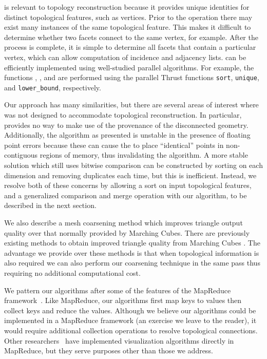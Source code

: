 \documentclass[10pt,journal,cspaper,compsoc]{IEEEtran}
\begin{document}
 is relevant to topology reconstruction because it provides unique identities for distinct topological features, such as vertices. Prior to the operation there may exist many instances of the same topological feature. This makes it difficult to determine whether two facets connect to the same vertex, for example. After the  process is complete, it is simple to determine all facets that contain a particular vertex, which can allow computation of incidence and adjacency lists.   can be efficiently implemented using well-studied parallel algorithms.  For example, the functions ,
, and  are performed using the parallel
Thrust functions \texttt{sort}, \texttt{unique}, and \texttt{lower\_bound},
respectively.

Our approach has many similarities, but there are several areas of interest where  was not designed to accommodate topological reconstruction. In particular,  provides no way to make use of the provenance of the disconnected geometry. Additionally, the  algorithm as presented is unstable in the presence of floating point errors because these can cause the  to place ``identical'' points in non-contiguous regions of memory, thus invalidating the algorithm. A more stable solution which still uses bitwise comparison can be constructed by sorting on each dimension and removing duplicates each time, but this is inefficient. Instead, we resolve both of these concerns by allowing a sort on input topological features, and a generalized comparison and merge operation with our algorithm, to be described in the next section.

We also describe a mesh coarsening method which improves triangle output quality over that normally provided by Marching Cubes. There are previously existing methods to obtain improved triangle quality from Marching Cubes \cite{Moore_Warren_1991}. The advantage we provide over these methods is that when topological information is also required we can also perform our coarsening technique in the same pass thus requiring no additional computational cost. 

We pattern our algorithms after some of the features of the MapReduce framework~\cite{MapReduce}. Like MapReduce, our algorithms first map keys to values then collect keys and reduce the values. Although we believe our algorithms could be implemented in a MapReduce framework (an exercise we leave to the reader), it would require additional collection operations to resolve topological connections. Other researchers~\cite{Stuart2010,Vo2011} have implemented visualization algorithms directly in MapReduce, but they serve purposes other than those we address.
\end{document}
